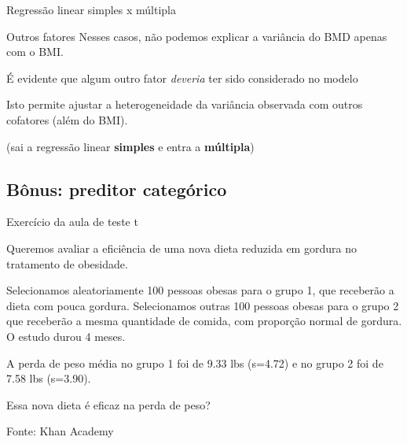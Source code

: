 \documentclass{beamer}
\begin{document}
\begin{frame}{\small Regressão linear simples x múltipla}
  \begin{block}{Outros fatores}
    Nesses casos, não podemos explicar a variância do BMD apenas com o BMI.

    \bigskip
    \small
    É evidente que algum outro fator {\it deveria} ter sido considerado no modelo

    \bigskip
    Isto permite \alert{ajustar} a heterogeneidade da variância observada com outros cofatores (além do BMI).
  \end{block}
  \vfill
  \hfill \footnotesize (sai a regressão linear {\bf simples} e entra a {\bf múltipla})
\end{frame}

\subsection{Bônus: preditor categórico}

\begin{frame}{\small Exercício da aula de teste t}
  \begin{exampleblock}{}
    \small
    Queremos avaliar a eficiência de uma nova dieta reduzida em
    gordura no tratamento de obesidade.

    \bigskip
    {\footnotesize
      Selecionamos aleatoriamente 100 pessoas obesas para o grupo 1, que receberão a dieta com pouca gordura.
      Selecionamos outras 100 pessoas obesas para o grupo 2 que receberão a mesma quantidade de comida, com proporção normal de gordura.
      O estudo durou 4 meses.
    }

    \bigskip
    \begin{exampleblock}{}
      \footnotesize
      A perda de peso média no grupo 1 foi de 9.33 lbs
      (s=4.72) e no grupo 2 foi de 7.58 lbs (s=3.90).
    \end{exampleblock}
  \end{exampleblock}
  \begin{block}{}
    Essa nova dieta é eficaz na perda de peso?
  \end{block}
  \hfill {\footnotesize Fonte: Khan Academy}
\end{frame}
\end{document}

